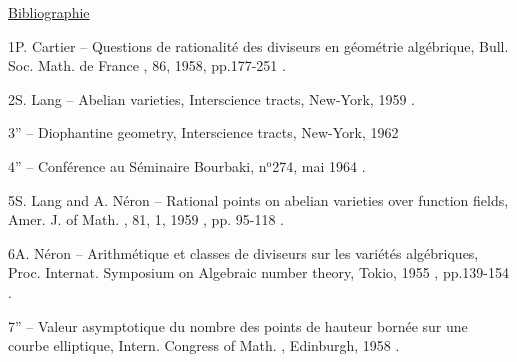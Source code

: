 {}

\begin{center}\uline{Bibliographie}\end{center}

\handwritten{[}1\handwritten{]}\quad P. Cartier -- Questions de rationalité des diviseurs en géométrie algébrique, Bull. Soc. Math. de France , 86, 1958, pp.177-251 .

\handwritten{[}2\handwritten{]}\quad S. Lang -- Abelian varieties, Interscience tracts, New-York,  1959 .

\handwritten{[}3\handwritten{]}\quad '' -- Diophantine geometry, Interscience tracts, New-York, 1962

\handwritten{[}4\handwritten{]}\quad '' -- Conférence au Séminaire Bourbaki, n$^{\mathrm o}$274, mai 1964 .

\handwritten{[}5\handwritten{]}\quad S. Lang and A. Néron -- Rational points on abelian varieties over function fields, Amer. J. of Math. , 81, 1, 1959 , pp. 95-118 .

\handwritten{[}6\handwritten{]}\quad A. Néron -- Arithmétique et classes de diviseurs sur les variétés algébriques, Proc. Internat. Symposium on Algebraic number theory, Tokio, 1955 , pp.139-154 .

\handwritten{[}7\handwritten{]}\quad '' -- Valeur asymptotique du nombre des points de hauteur bornée sur une courbe elliptique, Intern. Congress of Math. , Edinburgh, 1958 .

